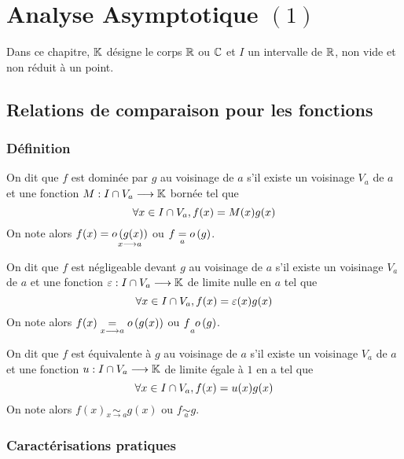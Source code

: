 \chapter{Analyse Asymptotique \((1)\)}
\label{chap:analyse-asymptotique1}
\minitoc
Dans ce chapitre, \(\mathbb{K}\) désigne le corps \(\mathbb{R}\) ou \(\mathbb{C}\) et \(I\) un intervalle de \(\mathbb{R}\), non vide et non réduit à un point.

\section{Relations de comparaison pour les fonctions}

\subsection{Définition}
\begin{defprop}[Domination]
    On dit que \(f\) est dominée par \(g\) au voisinage de \(a\) s’il existe un voisinage \(V_a\) de \(a\) et une fonction \(M : I \cap V_a \longrightarrow \mathbb{K}\) bornée tel que
    \[\forall x \in  I \cap V_a, f (x) = M (x)g(x)\]
    On note alors \(f (x) = \underset{x\longrightarrow a }{o \left(g(x)\right)}\) ou \(f \underset{a}{=} o \left(g\right)\).
\end{defprop}


\begin{defprop}[Négligeabilité]
    On dit que \(f\) est négligeable devant \(g\) au voisinage de \(a\) s’il existe un voisinage \(V_a\) de \(a\) et une fonction \(\varepsilon : I \cap V_a \longrightarrow \mathbb{K}\) de limite nulle en \(a\) tel que
    \[\forall x \in  I \cap V_a, f (x) = \varepsilon(x)g(x)\]
    On note alors \(f (x) \underset{x\longrightarrow a}{=}o \left(g(x)\right)\) ou \(f \underset{a}{} o \left(g\right)\).
\end{defprop}
\begin{defprop}[Equivalence]
    On dit que \(f\) est équivalente à \(g\) au voisinage de \(a\) s’il existe un voisinage \(V_a\) de \(a\) et une fonction \(u : I \cap V_a \longrightarrow \mathbb{K}\) de limite égale à \(1\) en a tel que
    \[\forall x \in  I \cap V_a, f (x) = u(x)g(x)\]
    On note alors \(f (x) \underset{x\to a}{\sim} g(x)\) ou \(f \underset{a}{\sim} g\).
\end{defprop}

\subsection{Caractérisations pratiques}

